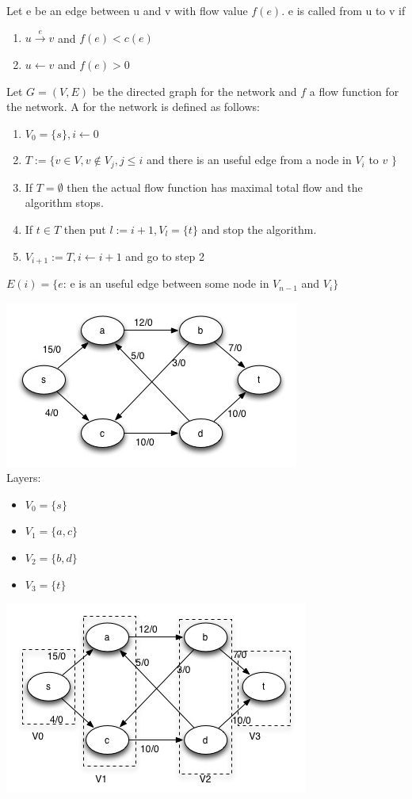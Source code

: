 \begin{definition}
Let e be an edge between u and v with flow value $f(e)$. e is called  from u to v if 
\begin{enumerate}
\item $ u \xrightarrow{e} v$ and $f(e) < c(e)$
\item $u \leftarrow v$ and $f(e) > 0 $
\end{enumerate}
Let $G = (V,E)$ be the directed graph for the network and $f$ a flow function for the network. A  for the network is defined as follows: 
\begin{enumerate}
\item $V_0 = \{s\}, i \leftarrow 0$
\item $ T := \{ v \in V, v \notin V_j, j \le i$ and there is an useful edge from a node in $V_{i}$ to $v$ $\}$
\item If $ T = \emptyset$ then the actual flow function has maximal total flow and the algorithm stops. 
\item If $t \in T$ then put $l := i+1, V_l = \{t\}$ and stop the algorithm.
\item $V_{i+1} := T, i \leftarrow i+1$ and go to step 2
\end{enumerate}
$E(i) = \{e$: e is an useful edge between some node in $V_{n-1}$ and $V_i \}$
\end{definition}

\begin{example}
\includegraphics{diagrams/Chapter3_Example5.jpg} \\
Layers:
\begin{itemize}
\item $V_0 = \{s\}$
\item $V_1 = \{a, c \}$
\item $V_2 = \{b, d \}$
\item $V_3 = \{t \}$
\end{itemize}
\includegraphics{diagrams/Chapter3_Example5_Solution.jpg} \\
\end{example}

